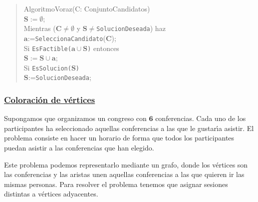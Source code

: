 \documentclass[ebook,oneside]{memoir}
\newcommand{\bolds}[1]{\boldsymbol{#1}}
\begin{document}
        \begin{quotation}
        AlgoritmoVoraz(C: ConjuntoCandidatos) \\[1ex]
        $\bolds{S:=\emptyset}$; \\[1ex]
        \textsf{Mientras} ($\bolds{C\neq\emptyset}$ \textsf{y} $\bolds{S\neq}$\texttt{SolucionDeseada}) \textsf{haz} \\[1ex]
            \hspace*{1cm} $\bolds{a}$:=\texttt{SeleccionaCandidato}($\bolds{C}$); \\[1ex]
            \hspace*{1cm} \textsf{Si} \texttt{EsFactible($\bolds{a\cup S}$)} \textsf{entonces} \\[1ex]
                \hspace*{2cm} $\bolds{S:=S\cup a}$; \\[1ex]
                \hspace*{2cm} \textsf{Si} \texttt{EsSolucion($\bolds{S}$)} \\[1ex]
                    \hspace*{3cm} $\bolds{S}$:=\texttt{SolucionDeseada}; \\[1ex]
        \end{quotation}



\subsubsection{\underline{Coloraci\'{o}n de v\'{e}rtices}}
\vspace{0.2cm}

Supongamos que organizamos un congreso con $\bolds{6}$ conferencias. Cada uno de los participantes ha seleccionado aquellas conferencias a las que le
gustar\'{\i}a asistir. El problema consiste en hacer un horario de forma que todos los participantes puedan asistir a las conferencias que han elegido.
\vspace{0.2cm}

Este problema podemos representarlo mediante un grafo, donde los v\'{e}rtices son las conferencias y las aristas unen aquellas con\-fe\-ren\-cias a las que quieren ir las mismas personas. Para resolver el problema tenemos que asignar sesiones distintas a v\'{e}rtices adyacentes.
\end{document}
